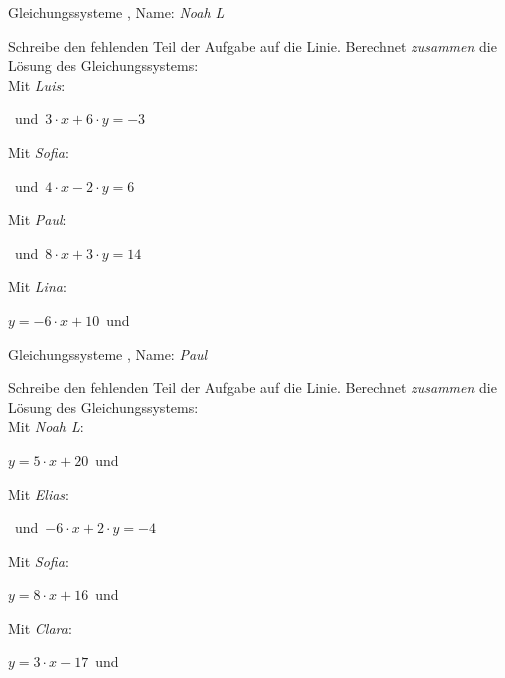 \newpage
\begin{center}\large Gleichungssysteme
, Name: \emph{Noah L}\end{center}
Schreibe den fehlenden Teil der Aufgabe auf die Linie. Berechnet \emph{zusammen} die Lösung des Gleichungssystems:
\\
\vfill Mit \emph{Luis}:
\begin{center}\underline{}
\mbox{ }und\mbox{ }$3\cdot x+6\cdot y=-3$\end{center}
\vfill Mit \emph{Sofia}:
\begin{center}\underline{}
\mbox{ }und\mbox{ }$4\cdot x-2\cdot y=6$\end{center}
\vfill Mit \emph{Paul}:
\begin{center}\underline{}
\mbox{ }und\mbox{ }$8\cdot x+3\cdot y=14$\end{center}
\vfill Mit \emph{Lina}:
\begin{center}$y=-6\cdot x+10$\mbox{ }und\mbox{ }\underline{}
\end{center}
\newpage
\begin{center}\large Gleichungssysteme
, Name: \emph{Paul}\end{center}
Schreibe den fehlenden Teil der Aufgabe auf die Linie. Berechnet \emph{zusammen} die Lösung des Gleichungssystems:
\\
\vfill Mit \emph{Noah L}:
\begin{center}$y=5\cdot x+20$\mbox{ }und\mbox{ }\underline{}
\end{center}
\vfill Mit \emph{Elias}:
\begin{center}\underline{}
\mbox{ }und\mbox{ }$-6\cdot x+2\cdot y=-4$\end{center}
\vfill Mit \emph{Sofia}:
\begin{center}$y=8\cdot x+16$\mbox{ }und\mbox{ }
\underline{}\end{center}
\vfill Mit \emph{Clara}:
\begin{center}$y=3\cdot x-17$\mbox{ }und\mbox{ }\underline{}
\end{center}
